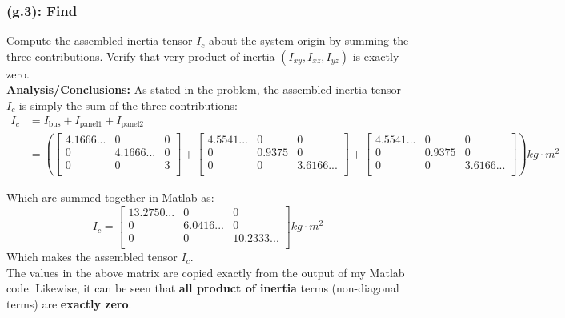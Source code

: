 \documentclass[titlepage]{article}
\begin{document}
\subsubsection*{(g.3): Find}
Compute the assembled inertia tensor $I_c$ about the system origin by summing the three contributions. Verify that very product of inertia $(I_{xy},I_{xz},I_{yz})$ is exactly zero.\\

\textbf{Analysis/Conclusions:}
As stated in the problem, the assembled inertia tensor $I_c$ is simply the sum of the three contributions:
\tiny
\begin{equation}
	\begin{split}
		I_c&=I_{\text{bus}}+I_{\text{panel1}}+I_{\text{panel2}} \\
		&=\left(
		\begin{bmatrix}
			4.1666... & 0 & 0 \\
			0 & 4.1666... & 0 \\
			0 & 0 & 3 \\
		\end{bmatrix}+
		\begin{bmatrix}
			4.5541... & 0 & 0 \\
			0 & 0.9375 & 0 \\
			0 & 0 & 3.6166... \\ 
		\end{bmatrix} +
		\begin{bmatrix}
			4.5541... & 0 & 0 \\
			0 & 0.9375 & 0 \\
			0 & 0 & 3.6166... \\ 
		\end{bmatrix}\right)kg\cdot m^2
	\end{split}
\end{equation}
\normalsize

\begin{mdframed}[linewidth=1pt, innertopmargin=10pt, innerbottommargin=10pt]
	Which are summed together in Matlab as:
	\begin{equation}
		I_c=
		\begin{bmatrix}
			13.2750... & 0 & 0 \\
			0 & 6.0416... & 0 \\
			0 & 0 & 10.2333... \\ 
		\end{bmatrix}  kg\cdot m^2
	\end{equation}
	Which makes the assembled tensor $I_c$.\\
	
	The values in the above matrix are copied exactly from the output of my Matlab code. Likewise, it can be seen that \textbf{all product of inertia} terms (non-diagonal terms) are \textbf{exactly zero}.
\end{mdframed}
\end{document}
